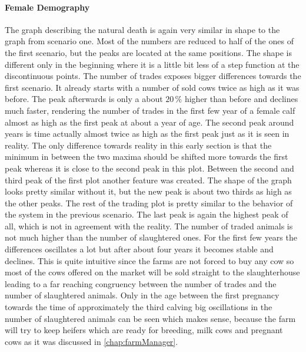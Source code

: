 \paragraph{Female Demography}
The graph describing the natural death is again very similar in shape to the graph from scenario one. Most of the numbers are reduced to half of the ones of the first scenario, but the peaks are located at the same positions. The shape is different only in the beginning where it is a little bit less of a step function at the discontinuous points.
The number of trades exposes bigger differences towards the first scenario. It already starts with a number of sold cows twice as high as it was before. The peak afterwards is only a about $20\,\%$ higher than before and declines much faster, rendering the number of trades in the first few year of a female calf almost as high as the first peak at about a year of age. The second peak around years is time actually almost twice as high as the first peak just as it is seen in reality. The only difference towards reality in this early section is that the minimum in between the two maxima should be shifted more towards the first peak whereas it is close to the second peak in this plot. Between the second and third peak of the first plot another feature was created. The shape of the graph looks pretty similar without it, but the new peak is about two thirds as high as the other peaks. The rest of the trading plot is pretty similar to the behavior of the system in the previous scenario. The last peak is again the highest peak of all, which is not in agreement with the reality. 
The number of traded animals is not much higher than the number of slaughtered ones. For the first few years the differences oscillates a lot but after about four years it becomes stable and declines. This is quite intuitive since the farms are not forced to buy any cow so most of the cows offered on the market will be sold straight to the slaughterhouse leading to a far reaching congruency between the number of trades and the number of slaughtered animals. Only in the age between the first pregnancy towards the time of approximately the third calving big oscillations in the number of slaughtered animals can be seen which makes sense, because the farm will try to keep heifers which are ready for breeding, milk cows and pregnant cows as it was discussed in \ref{chap:farmManager}.
